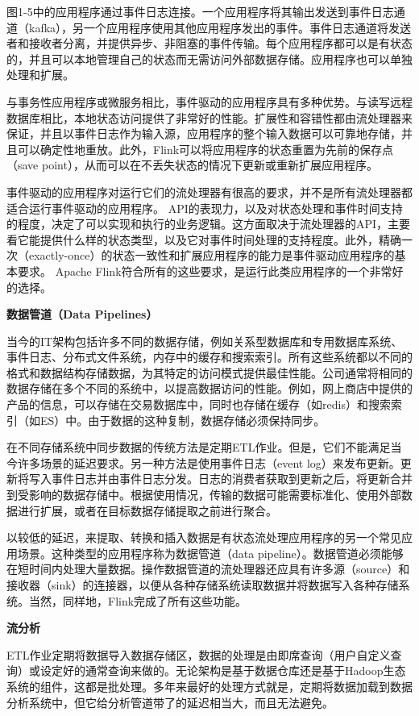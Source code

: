 \documentclass[oneside]{ctexbook}
\begin{document}
图1-5中的应用程序通过事件日志连接。一个应用程序将其输出发送到事件日志通道（kafka），另一个应用程序使用其他应用程序发出的事件。事件日志通道将发送者和接收者分离，并提供异步、非阻塞的事件传输。每个应用程序都可以是有状态的，并且可以本地管理自己的状态而无需访问外部数据存储。应用程序也可以单独处理和扩展。

与事务性应用程序或微服务相比，事件驱动的应用程序具有多种优势。与读写远程数据库相比，本地状态访问提供了非常好的性能。扩展性和容错性都由流处理器来保证，并且以事件日志作为输入源，应用程序的整个输入数据可以可靠地存储，并且可以确定性地重放。此外，Flink可以将应用程序的状态重置为先前的保存点（save point），从而可以在不丢失状态的情况下更新或重新扩展应用程序。

事件驱动的应用程序对运行它们的流处理器有很高的要求，并不是所有流处理器都适合运行事件驱动的应用程序。 API的表现力，以及对状态处理和事件时间支持的程度，决定了可以实现和执行的业务逻辑。这方面取决于流处理器的API，主要看它能提供什么样的状态类型，以及它对事件时间处理的支持程度。此外，精确一次（exactly-once）的状态一致性和扩展应用程序的能力是事件驱动应用程序的基本要求。 Apache Flink符合所有的这些要求，是运行此类应用程序的一个非常好的选择。

\textbf{数据管道（Data Pipelines）}

当今的IT架构包括许多不同的数据存储，例如关系型数据库和专用数据库系统、事件日志、分布式文件系统，内存中的缓存和搜索索引。所有这些系统都以不同的格式和数据结构存储数据，为其特定的访问模式提供最佳性能。公司通常将相同的数据存储在多个不同的系统中，以提高数据访问的性能。例如，网上商店中提供的产品的信息，可以存储在交易数据库中，同时也存储在缓存（如redis）和搜索索引（如ES）中。由于数据的这种复制，数据存储必须保持同步。

在不同存储系统中同步数据的传统方法是定期ETL作业。但是，它们不能满足当今许多场景的延迟要求。另一种方法是使用事件日志（event log）来发布更新。更新将写入事件日志并由事件日志分发。日志的消费者获取到更新之后，将更新合并到受影响的数据存储中。根据使用情况，传输的数据可能需要标准化、使用外部数据进行扩展，或者在目标数据存储提取之前进行聚合。

以较低的延迟，来提取、转换和插入数据是有状态流处理应用程序的另一个常见应用场景。这种类型的应用程序称为数据管道（data pipeline）。数据管道必须能够在短时间内处理大量数据。操作数据管道的流处理器还应具有许多源（source）和接收器（sink）的连接器，以便从各种存储系统读取数据并将数据写入各种存储系统。当然，同样地，Flink完成了所有这些功能。

\textbf{流分析}

ETL作业定期将数据导入数据存储区，数据的处理是由即席查询（用户自定义查询）或设定好的通常查询来做的。无论架构是基于数据仓库还是基于Hadoop生态系统的组件，这都是批处理。多年来最好的处理方式就是，定期将数据加载到数据分析系统中，但它给分析管道带了的延迟相当大，而且无法避免。
\end{document}
